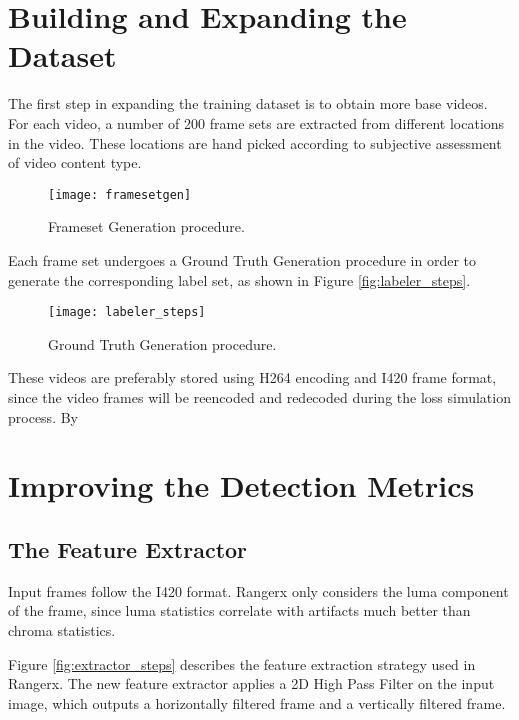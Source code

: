 \section{Building and Expanding the Dataset}
\label{sec:sol_dataset}

The first step in expanding the training dataset is to obtain more base videos.
For each video, a number of 200 frame sets are extracted from different locations in the video. These locations are hand picked according to subjective assessment of video content type.

\begin{figure} [!h]
  \centering
  
  \texttt{[image: framesetgen]}
  
  \caption{Frameset Generation procedure.}
  \label{fig:framesetgen}

\end{figure}

Each frame set undergoes a Ground Truth Generation procedure in order to generate the corresponding label set, as shown in Figure \ref{fig:labeler_steps}.

\begin{figure} [!h]
  \centering
  
  \texttt{[image: labeler\_steps]}
  
  \caption{Ground Truth Generation procedure.}
  \label{fig:labeler_general}

\end{figure}

These videos are preferably stored using H264 encoding and I420 frame format, since the video frames will be reencoded and redecoded during the loss simulation process. By

\section{Improving the Detection Metrics}
\label{sec:sol_metrics}

\subsection{The Feature Extractor}
\label{sec:sol_features}

Input frames follow the I420 format. Rangerx only considers the luma component of the frame, since luma statistics correlate with artifacts much better than chroma statistics.

Figure \ref{fig:extractor_steps} describes the feature extraction strategy used in Rangerx. The new feature extractor applies a 2D High Pass Filter on the input image, which outputs a horizontally filtered frame and a vertically filtered frame.


